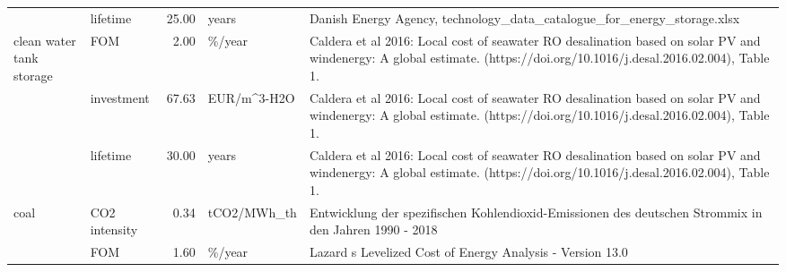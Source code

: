 \begin{longtable}{p{5cm}p{3cm}rp{3cm}p{11cm}}
                      & lifetime &          25.00 &                             years &                                                                                                                                                                                                                                                              Danish Energy Agency, technology\_data\_catalogue\_for\_energy\_storage.xlsx \\
clean water tank storage & FOM &           2.00 &                            \%/year &                                                                                                                                                              Caldera et al 2016: Local cost of seawater RO desalination based on solar PV and windenergy: A global estimate. (https://doi.org/10.1016/j.desal.2016.02.004), Table 1. \\
                      & investment &          67.63 &                       EUR/m\textasciicircum 3-H2O &                                                                                                                                                              Caldera et al 2016: Local cost of seawater RO desalination based on solar PV and windenergy: A global estimate. (https://doi.org/10.1016/j.desal.2016.02.004), Table 1. \\
                      & lifetime &          30.00 &                             years &                                                                                                                                                              Caldera et al 2016: Local cost of seawater RO desalination based on solar PV and windenergy: A global estimate. (https://doi.org/10.1016/j.desal.2016.02.004), Table 1. \\
coal & CO2 intensity &           0.34 &                       tCO2/MWh\_th &                                                                                                                                                                                                                                Entwicklung der spezifischen Kohlendioxid-Emissionen des deutschen Strommix in den Jahren 1990 - 2018 \\
                      & FOM &           1.60 &                            \%/year &                                                                                                                                                                                                                                                                            Lazard s Levelized Cost of Energy Analysis - Version 13.0 \\

\end{longtable}
